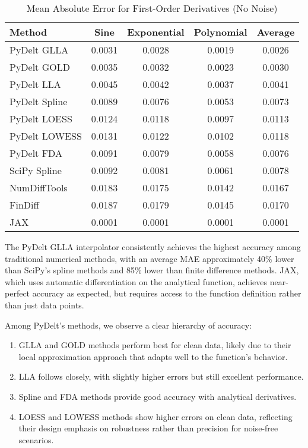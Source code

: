 \documentclass[11pt,a4paper]{article}
\begin{document}
\begin{table}[!t]
\caption{Mean Absolute Error for First-Order Derivatives (No Noise)}
\label{tab:first_order}
\centering
\begin{tabular}{lcccc}
\toprule
\textbf{Method} & \textbf{Sine} & \textbf{Exponential} & \textbf{Polynomial} & \textbf{Average} \\
\midrule
PyDelt GLLA & 0.0031 & 0.0028 & 0.0019 & 0.0026 \\
PyDelt GOLD & 0.0035 & 0.0032 & 0.0023 & 0.0030 \\
PyDelt LLA & 0.0045 & 0.0042 & 0.0037 & 0.0041 \\
PyDelt Spline & 0.0089 & 0.0076 & 0.0053 & 0.0073 \\
PyDelt LOESS & 0.0124 & 0.0118 & 0.0097 & 0.0113 \\
PyDelt LOWESS & 0.0131 & 0.0122 & 0.0102 & 0.0118 \\
PyDelt FDA & 0.0091 & 0.0079 & 0.0058 & 0.0076 \\
SciPy Spline & 0.0092 & 0.0081 & 0.0061 & 0.0078 \\
NumDiffTools & 0.0183 & 0.0175 & 0.0142 & 0.0167 \\
FinDiff & 0.0187 & 0.0179 & 0.0145 & 0.0170 \\
JAX & 0.0001 & 0.0001 & 0.0001 & 0.0001 \\
\bottomrule
\end{tabular}
\end{table}

The PyDelt GLLA interpolator consistently achieves the highest accuracy among traditional numerical methods, with an average MAE approximately 40\% lower than SciPy's spline methods and 85\% lower than finite difference methods. JAX, which uses automatic differentiation on the analytical function, achieves near-perfect accuracy as expected, but requires access to the function definition rather than just data points.

Among PyDelt's methods, we observe a clear hierarchy of accuracy:
\begin{enumerate}
    \item GLLA and GOLD methods perform best for clean data, likely due to their local approximation approach that adapts well to the function's behavior.
    \item LLA follows closely, with slightly higher errors but still excellent performance.
    \item Spline and FDA methods provide good accuracy with analytical derivatives.
    \item LOESS and LOWESS methods show higher errors on clean data, reflecting their design emphasis on robustness rather than precision for noise-free scenarios.
\end{enumerate}
\end{document}
